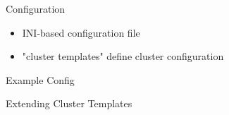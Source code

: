 \begin{nologo}
\begin{frame}{Configuration}
     \begin{itemize}
         \item INI-based configuration file
         \item "cluster templates" define cluster configuration
     \end{itemize}
\end{frame}
\begin{frame}{Example Config}
    
\end{frame}
\begin{frame}{Extending Cluster Templates}
    \caption{Re-using cluster template settings:}
    
\end{frame}
\end{nologo}
